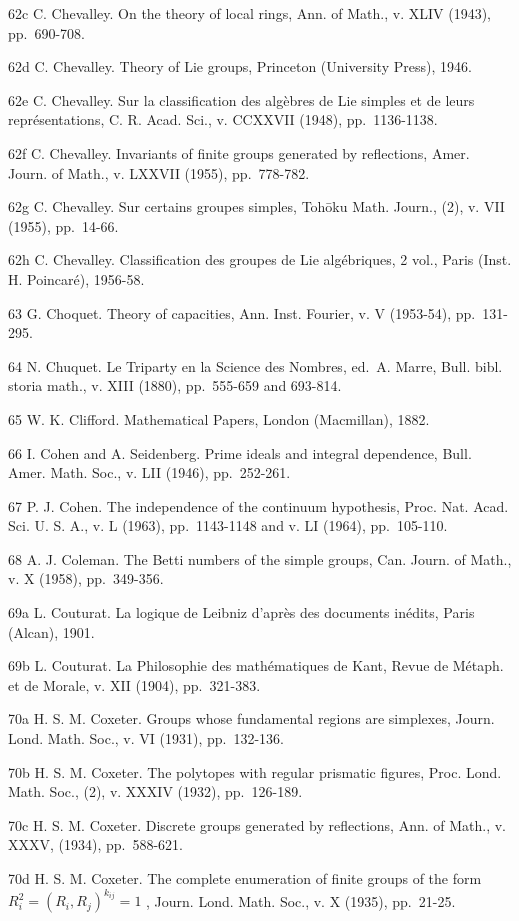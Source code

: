 62c C. Chevalley. On the theory of local rings, Ann. of Math., v. XLIV (1943), pp.~690-708.

62d C. Chevalley. Theory of Lie groups, Princeton (University Press), 1946.

62e C. Chevalley. Sur la classification des algèbres de Lie simples et de leurs représentations, C. R. Acad. Sci., v. CCXXVII (1948), pp.~1136-1138.

62f C. Chevalley. Invariants of finite groups generated by reflections, Amer. Journ. of Math., v. LXXVII (1955), pp.~778-782.

62g C. Chevalley. Sur certains groupes simples, Tohōku Math. Journ., (2), v. VII (1955), pp.~14-66.

62h C. Chevalley. Classification des groupes de Lie algébriques, 2 vol., Paris (Inst. H. Poincaré), 1956-58.

63 G. Choquet. Theory of capacities, Ann. Inst. Fourier, v. V (1953-54), pp.~131-295.

64 N. Chuquet. Le Triparty en la Science des Nombres, ed.~A. Marre, Bull. bibl. storia math., v. XIII (1880), pp.~555-659 and 693-814.

65 W. K. Clifford. Mathematical Papers, London (Macmillan), 1882.

66 I. Cohen and A. Seidenberg. Prime ideals and integral dependence, Bull. Amer. Math. Soc., v. LII (1946), pp.~252-261.

67 P. J. Cohen. The independence of the continuum hypothesis, Proc. Nat. Acad. Sci. U. S. A., v. L (1963), pp.~1143-1148 and v. LI (1964), pp.~105-110.

68 A. J. Coleman. The Betti numbers of the simple groups, Can. Journ. of Math., v. X (1958), pp.~349-356.

69a L. Couturat. La logique de Leibniz d'après des documents inédits, Paris (Alcan), 1901.

69b L. Couturat. La Philosophie des mathématiques de Kant, Revue de Métaph. et de Morale, v. XII (1904), pp.~321-383.

70a H. S. M. Coxeter. Groups whose fundamental regions are simplexes, Journ. Lond. Math. Soc., v. VI (1931), pp.~132-136.

70b H. S. M. Coxeter. The polytopes with regular prismatic figures, Proc. Lond. Math. Soc., (2), v. XXXIV (1932), pp.~126-189.

70c H. S. M. Coxeter. Discrete groups generated by reflections, Ann. of Math., v. XXXV, (1934), pp.~588-621.

70d H. S. M. Coxeter. The complete enumeration of finite groups of the form \(R_{i}^{2} = (R_{i}, R_{j})^{k_{ij}} = 1\) , Journ. Lond. Math. Soc., v. X (1935), pp.~21-25.

